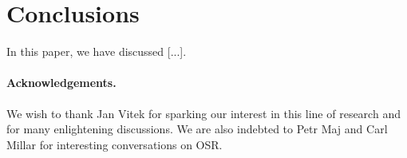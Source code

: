 \section{Conclusions}
\label{se:conclusions}

In this paper, we have discussed [...].

\paragraph{Acknowledgements.}

We wish to thank Jan Vitek for sparking our interest in this line of research and for many enlightening discussions. We are also indebted to Petr Maj and Carl Millar for interesting conversations on OSR.

  
  
  